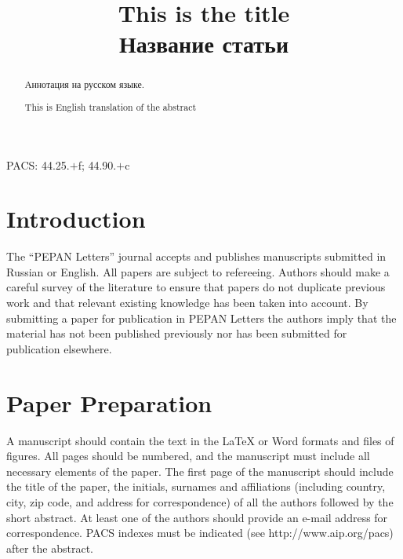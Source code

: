 \documentclass[a4paper]{panl}
\begin{document}

\title{This is the title \\ Название статьи}
\maketitle
{}
\setcounter{footnote}{0}

\begin{abstract}
Аннотация на русском языке. \
\vspace{0.2cm}

This is English translation of the abstract
\end{abstract}
\vspace*{6pt}

\noindent
PACS: 44.25.$+$f; 44.90.$+$c

\label{sec:intro}
\section*{Introduction}

The ``PEPAN Letters'' journal accepts and publishes manuscripts submitted in Russian or English. All papers are subject to refereeing. Authors should make a careful survey of the literature to ensure that papers do not duplicate previous work and that relevant existing knowledge has been taken into account. By submitting a paper for publication in PEPAN Letters the authors imply that the material has not been published previously nor has been submitted for publication elsewhere.

\label{sec:preparation}
\section*{Paper Preparation}

A manuscript should contain the text in the LaTeX or Word formats and files of figures. 
All pages should be numbered, and the manuscript must include all necessary elements of the paper.
The first page of the manuscript should include the title of the paper, the initials, surnames and 
affiliations (including country, city, zip code, and address for correspondence) of all the authors 
followed by the short abstract. At least one of the authors should provide an e-mail address for 
correspondence. PACS indexes must be indicated (see http://www.aip.org/pacs) after the abstract.
\end{document}
